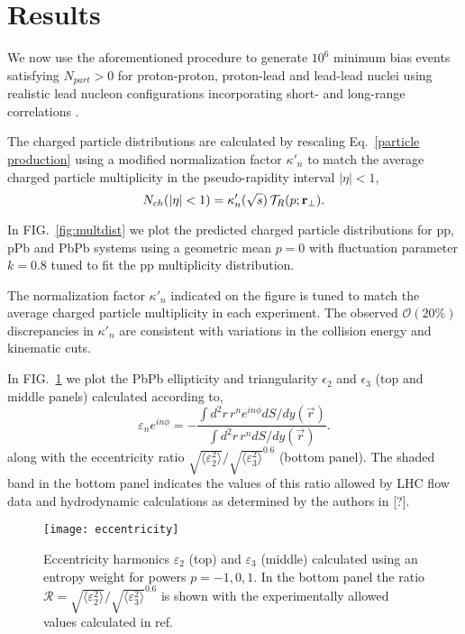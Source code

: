 \documentclass[aps,prl,reprint,amsmath,nofootinbib]{revtex4-1}
\begin{document}
\section{Results}

We now use the aforementioned procedure to generate $10^6$ minimum bias events satisfying $N_{part} > 0$ for
proton-proton, proton-lead and lead-lead nuclei using realistic lead nucleon configurations incorporating
short- and long-range correlations \cite{nucleon-correlations}.

The charged particle distributions are calculated by rescaling Eq.~\eqref{particle production} using a
modified normalization factor $\kappa'_n$ to match the average charged particle multiplicity in the
pseudo-rapidity interval $|\eta| < 1$,
\begin{equation}
  N_{ch}(|\eta|<1) = \kappa'_n(\sqrt{s})\, \mathcal{T}_R(p;{\bf r}_\perp).
\end{equation}

In FIG.~\ref{fig:multdist} we plot the predicted charged particle distributions for pp, pPb and PbPb systems
using a geometric mean $p=0$ with fluctuation parameter $k=0.8$ tuned to fit the pp multiplicity
distribution.

The normalization factor $\kappa'_n$ indicated on the figure is tuned to match the average charged particle
multiplicity in each experiment. The observed $\mathcal{O}(20\%)$ discrepancies in $\kappa'_n$ are consistent
with variations in the collision energy and kinematic cuts.

In FIG.~\ref{fig:eccen} we plot the PbPb ellipticity and triangularity $\epsilon_2$ and $\epsilon_3$ (top
and middle panels) calculated according to,
\begin{equation}
  \varepsilon_n e^{i n\phi} = -\frac{\int d^2r\, r^n e^{i n \phi} dS/dy(\vec{r})}{\int d^2r\, r^n dS/dy(\vec{r})}.
\end{equation}
along with the eccentricity ratio $\sqrt{\langle \varepsilon_2^2 \rangle}/\sqrt{\langle \varepsilon_3^2
\rangle}^{0.6}$ (bottom panel). The shaded band in the bottom panel indicates the values of this ratio allowed
by LHC flow data and hydrodynamic calculations as determined by the authors in [?].

\begin{figure}[t]
  \texttt{[image: eccentricity]}
  \caption{\label{fig:eccen}Eccentricity harmonics $\varepsilon_2$ (top) and $\varepsilon_3$ (middle)
  calculated using an entropy weight for powers $p=-1,0,1$.  In the bottom panel the ratio $\mathcal{R} =
  \sqrt{\langle \varepsilon_2^2 \rangle}/\sqrt{\langle \varepsilon_3^2 \rangle}^{0.6}$ is shown with the
  experimentally allowed values calculated in ref.\ \cite{constraining-ic}}
\end{figure}
\end{document}

